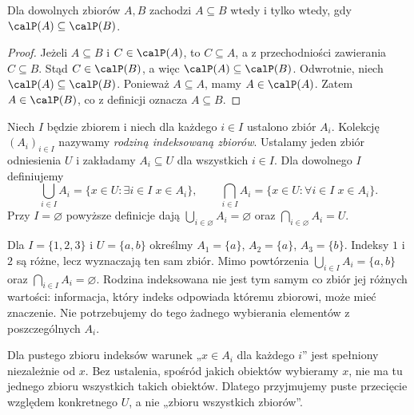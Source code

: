 \begin{twierdzenie}
\label{thm:power-monotonic}
Dla dowolnych zbiorów $A,B$ zachodzi
$A\subseteq B$ wtedy i tylko wtedy, gdy
$\calP(A)\subseteq\calP(B)$.
\end{twierdzenie}
\begin{proof}
Jeżeli $A\subseteq B$ i $C\in\calP(A)$,
to $C\subseteq A$, a z przechodniości zawierania
$C\subseteq B$. Stąd $C\in\calP(B)$, a więc
$\calP(A)\subseteq\calP(B)$.
Odwrotnie, niech $\calP(A)\subseteq\calP(B)$.
Ponieważ $A\subseteq A$, mamy $A\in\calP(A)$.
Zatem $A\in\calP(B)$, co z definicji oznacza
$A\subseteq B$.
\end{proof}

\begin{definicja}
Niech $I$ będzie zbiorem i niech dla każdego $i\in I$
ustalono zbiór $A_i$. Kolekcję $(A_i)_{i\in I}$ nazywamy
\emph{rodziną indeksowaną zbiorów}. Ustalamy jeden
zbiór odniesienia $U$ i zakładamy $A_i\subseteq U$
dla wszystkich $i\in I$. Dla dowolnego $I$ definiujemy
\[
\bigcup_{i\in I}A_i
=\{x\in U:\exists i\in I\;x\in A_i\},\qquad
\bigcap_{i\in I}A_i
=\{x\in U:\forall i\in I\;x\in A_i\}.
\]
Przy $I=\varnothing$ powyższe definicje dają
$\bigcup_{i\in\varnothing}A_i=\varnothing$ oraz
$\bigcap_{i\in\varnothing}A_i=U$.
\end{definicja}

\begin{przyklad}
\label{ex:indexed-repetitions-xlii}
Dla $I=\{1,2,3\}$ i $U=\{a,b\}$ określmy
$A_1=\{a\}$, $A_2=\{a\}$, $A_3=\{b\}$.
Indeksy $1$ i $2$ są różne, lecz wyznaczają ten sam zbiór.
Mimo powtórzenia $\bigcup_{i\in I}A_i=\{a,b\}$ oraz
$\bigcap_{i\in I}A_i=\varnothing$. Rodzina indeksowana
nie jest tym samym co zbiór jej różnych wartości:
informacja, który indeks odpowiada któremu zbiorowi,
może mieć znaczenie. Nie potrzebujemy do tego żadnego
wybierania elementów z poszczególnych $A_i$.
\end{przyklad}


\begin{uwaga}
Dla pustego zbioru indeksów warunek „$x\in A_i$ dla każdego $i$”
jest spełniony niezależnie od $x$. Bez ustalenia, spośród jakich
obiektów wybieramy $x$, nie ma tu jednego zbioru wszystkich takich
obiektów. Dlatego przyjmujemy puste przecięcie względem
konkretnego $U$, a nie „zbioru wszystkich zbiorów”.
\end{uwaga}

